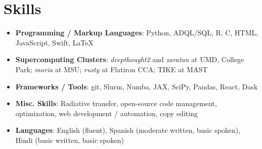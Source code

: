 \documentclass[letterpaper,12pt]{article}
\newcommand{\shorterSection}[1]{\section{#1}}
\renewcommand{\small}{\normalsize}
\newcommand{\resumeSubHeadingListStart}[1][]{\begin{itemize}[leftmargin=*,#1]}
\newcommand{\resumeSubHeadingListEnd}{\end{itemize}}
\begin{document}





\shorterSection{Skills}
  \resumeSubHeadingListStart
  \small
    \item{
     \textbf{Programming / Markup Languages}{: Python, ADQL/SQL, R, C, HTML, JavaScript, Swift, \LaTeX}
    }
    \item{
     \textbf{Supercomputing Clusters}{: \textit{deepthought2} and \textit{zaratan} at UMD, College Park; \textit{moria} at MSU; \textit{rusty} at Flatiron CCA; TIKE at MAST}
    }
    \item{
     \textbf{Frameworks / Tools}{: git, Slurm, Numba, JAX, SciPy, Pandas, React, Dask}
    }
    \item{
     \textbf{Misc. Skills}{: Radiative transfer, open-source code management, optimization, web development / automation, copy editing}
    }
    \item{
     \textbf{Languages}{: English (fluent), Spanish (moderate written, basic spoken), Hindi (basic written, basic spoken)}
    }
\resumeSubHeadingListEnd
\end{document}

